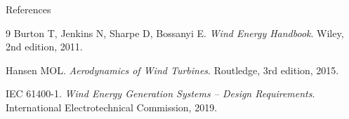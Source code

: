 
\begin{frame}{References}
    \begin{thebibliography}{9}
        Burton T, Jenkins N, Sharpe D, Bossanyi E.
        \textit{Wind Energy Handbook}.
        Wiley, 2nd edition, 2011.

        Hansen MOL.
        \textit{Aerodynamics of Wind Turbines}.
        Routledge, 3rd edition, 2015.

        IEC 61400-1.
        \textit{Wind Energy Generation Systems -- Design Requirements}.
        International Electrotechnical Commission, 2019.
    \end{thebibliography}
\end{frame}
